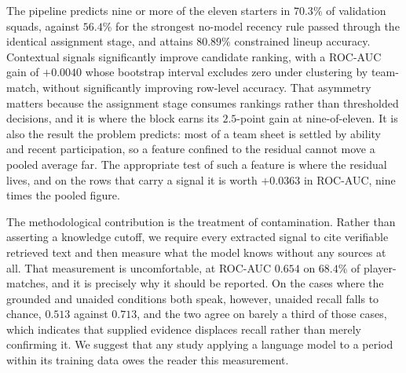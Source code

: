 \documentclass[conference]{IEEEtran}
\begin{document}
The pipeline predicts nine or more of the eleven starters in $70.3\%$ of validation squads, against $56.4\%$ for the strongest no-model recency rule passed through the identical assignment stage, and attains $80.89\%$ constrained lineup accuracy. Contextual signals significantly improve candidate ranking, with a ROC-AUC gain of $+0.0040$ whose bootstrap interval excludes zero under clustering by team-match, without significantly improving row-level accuracy. That asymmetry matters because the assignment stage consumes rankings rather than thresholded decisions, and it is where the block earns its $2.5$-point gain at nine-of-eleven. It is also the result the problem predicts: most of a team sheet is settled by ability and recent participation, so a feature confined to the residual cannot move a pooled average far. The appropriate test of such a feature is where the residual lives, and on the rows that carry a signal it is worth $+0.0363$ in ROC-AUC, nine times the pooled figure.

The methodological contribution is the treatment of contamination. Rather than asserting a knowledge cutoff, we require every extracted signal to cite verifiable retrieved text and then measure what the model knows without any sources at all. That measurement is uncomfortable, at ROC-AUC $0.654$ on $68.4\%$ of player-matches, and it is precisely why it should be reported. On the cases where the grounded and unaided conditions both speak, however, unaided recall falls to chance, $0.513$ against $0.713$, and the two agree on barely a third of those cases, which indicates that supplied evidence displaces recall rather than merely confirming it. We suggest that any study applying a language model to a period within its training data owes the reader this measurement.

\let\oldthebibliography\thebibliography
\renewcommand{\thebibliography}[1]{%
  \oldthebibliography{#1}%
  \footnotesize\setlength{\itemsep}{0pt plus 0.1pt}}


\end{document}
